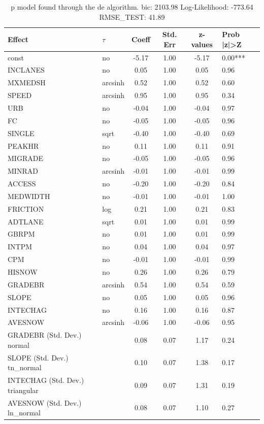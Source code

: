 \begin{table}
	\caption{p model found through the de algorithm. bic: 2103.98 Log-Likelihood: -773.64 RMSE_TEST: 41.89}
	\begin{center}
		\begin{tabular}{|l|l|c|c|c|l|}
			\hline
			Effect & $\tau$ & Coeff & Std. Err & z-values & Prob |z|>Z \\
			\hline
			const & no & -5.17 & 1.00 & -5.17 & 0.00*** \\
			\hline
			INCLANES & no & 0.05 & 1.00 & 0.05 & 0.96 \\
			\hline
			MXMEDSH & arcsinh & 0.52 & 1.00 & 0.52 & 0.60 \\
			\hline
			SPEED & arcsinh & 0.95 & 1.00 & 0.95 & 0.34 \\
			\hline
			URB & no & -0.04 & 1.00 & -0.04 & 0.97 \\
			\hline
			FC & no & -0.05 & 1.00 & -0.05 & 0.96 \\
			\hline
			SINGLE & sqrt & -0.40 & 1.00 & -0.40 & 0.69 \\
			\hline
			PEAKHR & no & 0.11 & 1.00 & 0.11 & 0.91 \\
			\hline
			MIGRADE & no & -0.05 & 1.00 & -0.05 & 0.96 \\
			\hline
			MINRAD & arcsinh & -0.01 & 1.00 & -0.01 & 0.99 \\
			\hline
			ACCESS & no & -0.20 & 1.00 & -0.20 & 0.84 \\
			\hline
			MEDWIDTH & no & -0.01 & 1.00 & -0.01 & 1.00 \\
			\hline
			FRICTION & log & 0.21 & 1.00 & 0.21 & 0.83 \\
			\hline
			ADTLANE & sqrt & 0.01 & 1.00 & 0.01 & 0.99 \\
			\hline
			GBRPM & no & 0.01 & 1.00 & 0.01 & 0.99 \\
			\hline
			INTPM & no & 0.04 & 1.00 & 0.04 & 0.97 \\
			\hline
			CPM & no & -0.01 & 1.00 & -0.01 & 0.99 \\
			\hline
			HISNOW & no & 0.26 & 1.00 & 0.26 & 0.79 \\
			\hline
			GRADEBR & arcsinh & 0.54 & 1.00 & 0.54 & 0.59 \\
			\hline
			SLOPE & no & 0.05 & 1.00 & 0.05 & 0.96 \\
			\hline
			INTECHAG & no & 0.16 & 1.00 & 0.16 & 0.87 \\
			\hline
			AVESNOW & arcsinh & -0.06 & 1.00 & -0.06 & 0.95 \\
			\hline
			GRADEBR (Std. Dev.) normal &  & 0.08 & 0.07 & 1.17 & 0.24 \\
			\hline
			SLOPE (Std. Dev.) tn_normal &  & 0.10 & 0.07 & 1.38 & 0.17 \\
			\hline
			INTECHAG (Std. Dev.) triangular &  & 0.09 & 0.07 & 1.31 & 0.19 \\
			\hline
			AVESNOW (Std. Dev.) ln_normal &  & 0.08 & 0.07 & 1.10 & 0.27 \\
			\hline
		\end{tabular}
	\end{center}
\end{table}